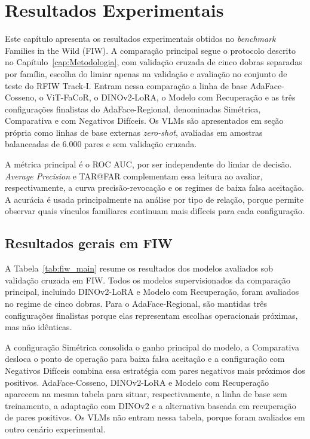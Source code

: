 \chapter[Resultados Experimentais]{Resultados Experimentais}
\label{cap:resultados}

Este capítulo apresenta os resultados experimentais obtidos no \textit{benchmark} Families in the Wild (FIW). A comparação principal segue o protocolo descrito no Capítulo~\ref{cap:Metodologia}, com validação cruzada de cinco dobras separadas por família, escolha do limiar apenas na validação e avaliação no conjunto de teste do RFIW Track-I. Entram nessa comparação a linha de base AdaFace-Cosseno, o ViT-FaCoR, o DINOv2-LoRA, o Modelo com Recuperação e as três configurações finalistas do AdaFace-Regional, denominadas Simétrica, Comparativa e com Negativos Difíceis. Os VLMs são apresentados em seção própria como linhas de base externas \textit{zero-shot}, avaliadas em amostras balanceadas de 6.000 pares e sem validação cruzada.

A métrica principal é o ROC AUC, por ser independente do limiar de decisão. \textit{Average Precision} e TAR@FAR complementam essa leitura ao avaliar, respectivamente, a curva precisão-revocação e os regimes de baixa falsa aceitação. A acurácia é usada principalmente na análise por tipo de relação, porque permite observar quais vínculos familiares continuam mais difíceis para cada configuração.

\section{Resultados gerais em FIW}

A Tabela~\ref{tab:fiw_main} resume os resultados dos modelos avaliados sob validação cruzada em FIW. Todos os modelos supervisionados da comparação principal, incluindo DINOv2-LoRA e Modelo com Recuperação, foram avaliados no regime de cinco dobras. Para o AdaFace-Regional, são mantidas três configurações finalistas porque elas representam escolhas operacionais próximas, mas não idênticas.

A configuração Simétrica consolida o ganho principal do modelo, a Comparativa desloca o ponto de operação para baixa falsa aceitação e a configuração com Negativos Difíceis combina essa estratégia com pares negativos mais próximos dos positivos. AdaFace-Cosseno, DINOv2-LoRA e Modelo com Recuperação aparecem na mesma tabela para situar, respectivamente, a linha de base sem treinamento, a adaptação com DINOv2 e a alternativa baseada em recuperação de pares positivos. Os VLMs não entram nessa tabela, porque foram avaliados em outro cenário experimental.

